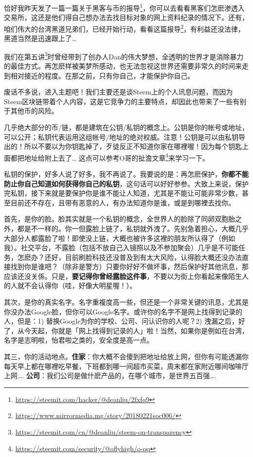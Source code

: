 \documentclass[]{ctexbook}
\renewcommand{\href}[2]{#2\footnote{\url{#1}}}
\begin{document}
恰好我昨天发了一篇\href{https://steemit.com/hacker/@deanliu/2fxfq9}{一篇关于黑客与币的报导}，你可以去看看黑客们怎麽渗透入交易所，这还是他们得自己想办法去找目标对象的网上资料纪录的情况下。还有，咱们伟大的台湾黑道兄弟们，已经开始行动，看看这篇\href{https://www.mirrormedia.mg/story/20180221soc006/}{报导}，有利益还没法律，黑道当然是迅速跟上了\ldots{}

我们在\href{https://steemit.com/cn/@deanliu/steem-on-transparency}{第五讲}时曾经带到了创办人Dan的伟大梦想，全透明的世界才是消除暴力的最佳方式。再怎麽样被美梦所感动，也无法忽视这世界还需要非常久的时间来走到相对接近的程度。在那之前，只有你自己，才能保护你自己。

废话不多说，进入主题吧！我们主要还是谈Steem上的个人讯息问题，而因为Steem区块链带着个人内容，这是它竞争力的主要特点，却因此也带来了一些有别于其他币的风险。

几乎绝大部分的币/链，都是建筑在公钥/私钥的概念上。公钥是你的帐号或地址，可以公开；私钥代表运用这组帐号/地址的绝对权威。注意！公钥是可以由私钥导出的！所以不要以为你钥匙掉了，歹徒反正不知道你家在哪裡喔！因为每个钥匙上面都把地址给附上去了\ldots{} 这点可以参考\href{https://steemit.com/security/@oflyhigh/o-qq}{O哥的扯澹文章}来学习一下。

私钥的保护，好多人说了好多，我不再说了。我要说的是：再怎麽保护，\textbf{你都不能防止你自己知道如何获得你自己的私钥}，这句话可以好好参参。大致上来说，保护完私钥，接下来就是要保护你是谁不能让人知道，尤其是不能让可能非常少数，甚至目前还不存在，且带有恶意的人，有办法知道你是谁，或是到哪裡去找你。

首先，是你的脸。脸其实就是一个私钥的概念，全世界人的脸除了同卵双胞胎之外，都是不一样的。你一但露脸上链了，私钥就外洩了。先别急着担心，大概几乎大部分人都露脸了啦！即使没上链，大概也被许多这裡的朋友所认得了（例如我）。社交平台，不露脸（包括不放自己入镜照以及不参加聚会）几乎是不可能任务，怎麽办？还好，目前刷脸科技还没普及到有太大风险，认得脸大概还没办法直接找到你是谁吧？（除非是警方）只要你好好不做坏事，然后保护好其他讯息，那应该还没关係。只是，\textbf{要记得你曾经露脸这件事}，不要以为街上你看起来像陌生人的人就不会认得你（哇，好像大明星喔！）。

其次，是你的真实名字。名字重複度高一些，但还是一个非常关键的讯息，尤其是你没办法Google脸，但你可以Google名字。或许你的名字不是网上找得到记录的人，但是：1) 替换Google为你的学校、公司、问认识你的人呢？2) 洩漏之后，好了，从今天起，你就是「网上找得到记录的人」啦！当然，如果你是例如在台湾，名字是志明啦，怡君啦之类的，安全度是高一点。

其三，你的活动地点。\textbf{住家}：你大概不会傻到把地址给放上网，但你有可能透漏你每天早上都在哪裡吃早餐，下班都到哪一间超市买菜，周末都在家附近哪间咖啡厅上网\ldots{}. \textbf{公司}：我们公司是做什麽产品的，在哪个城市，是世界五百强\ldots{}.
\end{document}
